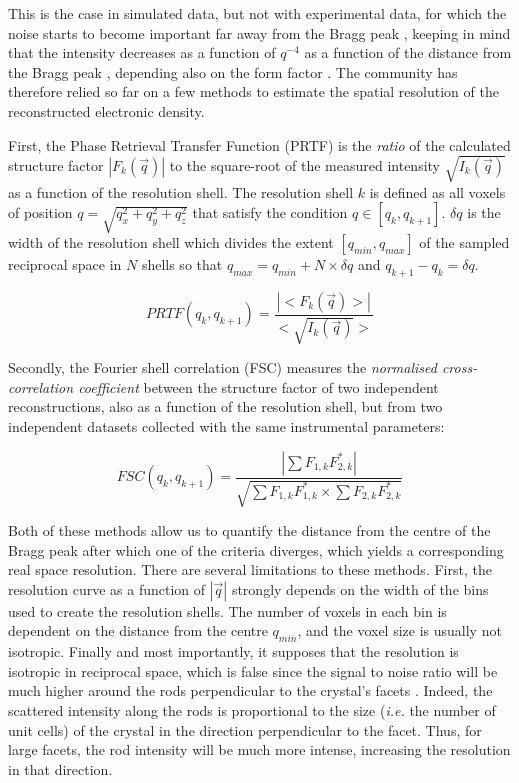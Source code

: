 This is the case in simulated data, but not with experimental data, for which the noise starts to become important far away from the Bragg peak \parencite{Bikondoa2021}, keeping in mind that the intensity decreases as a function of $q^{-4}$ as a function of the distance from the Bragg peak \parencite{Marchesini2003a}, depending also on the form factor \parencite{Croset2017}.
The community has therefore relied so far on a few methods to estimate the spatial resolution of the reconstructed electronic density.

First, the Phase Retrieval Transfer Function (PRTF) \parencite{Chapman2006} is the \textit{ratio} of the calculated structure factor $|F_k(\vec{q})|$ to the square-root of the measured intensity $\sqrt{I_k(\vec{q})}$ as a function of the resolution shell.
The resolution shell $k$ is defined as all voxels of position $q=\sqrt{q_x^2 + q_y^2 +q_z^2}$ that satisfy the condition $q \in [q_k, q_{k+1}]$.
$\delta q$ is the width of the resolution shell which divides the extent $[q_{min}, q_{max}]$ of the sampled reciprocal space in $N$ shells so that $q_{max} = q_{min} + N \times \delta q$ and $q_{k+1} - q_{k} = \delta q$.

\begin{equation}
    PRTF(q_k, q_{k+1}) = \frac{|<F_k(\vec{q})>|}{<\sqrt{I_k(\vec{q})}>}
\end{equation}

Secondly, the Fourier shell correlation (FSC) \parencite{VanHeel2005} measures the \textit{normalised cross-correlation coefficient} between the structure factor of two independent reconstructions, also as a function of the resolution shell, but from two independent datasets collected with the same instrumental parameters:

\begin{equation}
    FSC(q_k, q_{k+1}) = \frac{ |\sum F_{1,k} F_{2,k}^*| }{\sqrt{ \sum F_{1,k} F_{1,k}^* \times \sum F_{2,k} F_{2,k}^*}}
\end{equation}

Both of these methods allow us to quantify the distance from the centre of the Bragg peak after which one of the criteria diverges, which yields a corresponding real space resolution.
There are several limitations to these methods.
First, the resolution curve as a function of $|\vec{q}|$ strongly depends on the width of the bins used to create the resolution shells.
The number of voxels in each bin is dependent on the distance from the centre $q_{min}$, and the voxel size is usually not isotropic.
Finally and most importantly, it supposes that the resolution is isotropic in reciprocal space, which is false since the signal to noise ratio will be much higher around the rods perpendicular to the crystal's facets \parencite{Cherukara2018a}.
Indeed, the scattered intensity along the rods is proportional to the size (\textit{i.e.} the number of unit cells) of the crystal in the direction perpendicular to the facet.
Thus, for large facets, the rod intensity will be much more intense, increasing the resolution in that direction.

